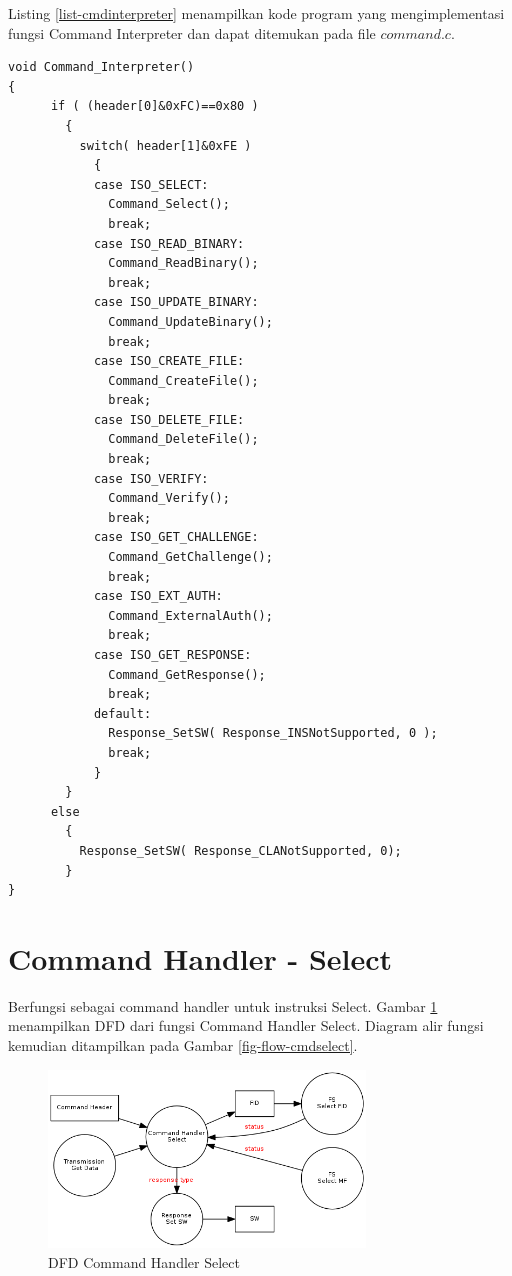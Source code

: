 Listing \ref{list-cmdinterpreter} menampilkan kode program yang mengimplementasi fungsi Command Interpreter dan dapat ditemukan pada file $command.c$.

\begin{lstlisting}[caption={Implementasi Fungsi Command Interpreter},label={list-cmdinterpreter}]
void Command_Interpreter()
{
      if ( (header[0]&0xFC)==0x80 )
        {
          switch( header[1]&0xFE )
            {
            case ISO_SELECT:
              Command_Select();
              break;
            case ISO_READ_BINARY:
              Command_ReadBinary();
              break;
            case ISO_UPDATE_BINARY:
              Command_UpdateBinary();
              break;
            case ISO_CREATE_FILE:
              Command_CreateFile();
              break;
            case ISO_DELETE_FILE:
              Command_DeleteFile();
              break;
            case ISO_VERIFY:
              Command_Verify();
              break;
            case ISO_GET_CHALLENGE:
              Command_GetChallenge();
              break;
            case ISO_EXT_AUTH:
              Command_ExternalAuth();
              break;
            case ISO_GET_RESPONSE:
              Command_GetResponse();
              break;
            default:
              Response_SetSW( Response_INSNotSupported, 0 );
              break;
            }
        }
      else
        {
          Response_SetSW( Response_CLANotSupported, 0);
        }
}
\end{lstlisting}

\section{Command Handler - Select}
\label{sec_cmdselect}

Berfungsi sebagai command handler untuk instruksi Select. Gambar \ref{fig-dfd-cmdselect} menampilkan DFD dari fungsi Command Handler Select. Diagram alir fungsi kemudian ditampilkan pada Gambar \ref{fig-flow-cmdselect}. 

\begin{figure}[h]
\centering
\includegraphics[width=0.75\textwidth]{image/command/dfd_cmdselect.png}
\caption{DFD Command Handler Select}
\label{fig-dfd-cmdselect}
\end{figure}

